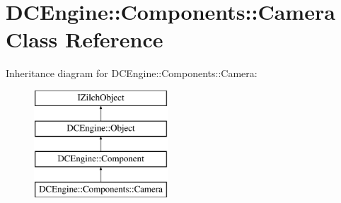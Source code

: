 \hypertarget{classDCEngine_1_1Components_1_1Camera}{\section{D\-C\-Engine\-:\-:Components\-:\-:Camera Class Reference}
\label{classDCEngine_1_1Components_1_1Camera}
}
Inheritance diagram for D\-C\-Engine\-:\-:Components\-:\-:Camera\-:\begin{figure}[H]
\begin{center}
\leavevmode
\includegraphics[height=4.000000cm]{classDCEngine_1_1Components_1_1Camera}
\end{center}
\end{figure}
